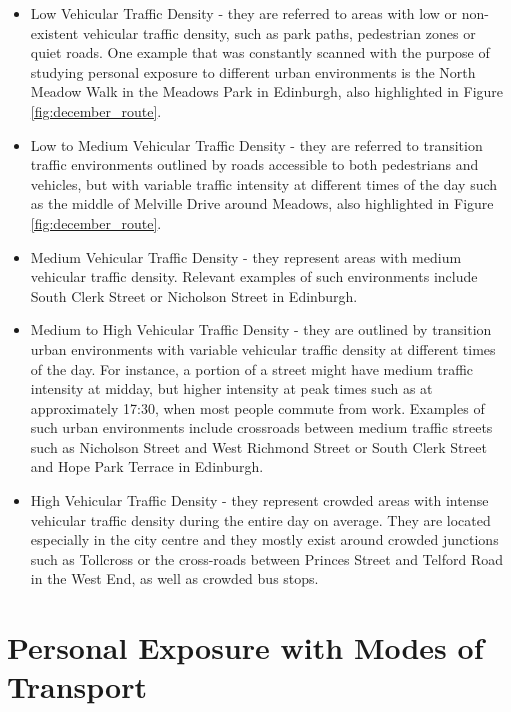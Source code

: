 \documentclass[bsc,frontabs,twoside,singlespacing, parskip,deptreport]{infthesis}     %
\begin{document}
\begin{itemize}
\item Low Vehicular Traffic Density - they are referred to areas with low or non-existent vehicular traffic density, such as park paths, pedestrian zones or quiet roads. One example that was constantly scanned with the purpose of studying personal exposure to different urban environments is the North Meadow Walk in the Meadows Park in Edinburgh, also highlighted in Figure \ref{fig:december_route}.

\item Low to Medium Vehicular Traffic Density - they are referred to transition traffic environments outlined by roads accessible to both pedestrians and vehicles, but with variable traffic intensity at different times of the day such as the middle of Melville Drive around Meadows, also highlighted in Figure \ref{fig:december_route}.

\item Medium Vehicular Traffic Density - they represent areas with medium vehicular traffic density. Relevant examples of such environments include South Clerk Street or Nicholson Street in Edinburgh.

\item Medium to High Vehicular Traffic Density - they are outlined by transition urban environments with variable vehicular traffic density at different times of the day. For instance, a portion of a street might have medium traffic intensity at midday, but higher intensity at peak times such as at approximately 17:30, when most people commute from work. Examples of such urban environments include crossroads between medium traffic streets such as Nicholson Street and West Richmond Street or South Clerk Street and Hope Park Terrace in Edinburgh. 

\item High Vehicular Traffic Density - they represent crowded areas with intense vehicular traffic density during the entire day on average. They are located especially in the city centre and they mostly exist around crowded junctions such as Tollcross or the cross-roads between Princes Street and Telford Road in the West End, as well as crowded bus stops.
\end{itemize}
\label{list:urban-environments}

\section{Personal Exposure with Modes of Transport}
\end{document}
